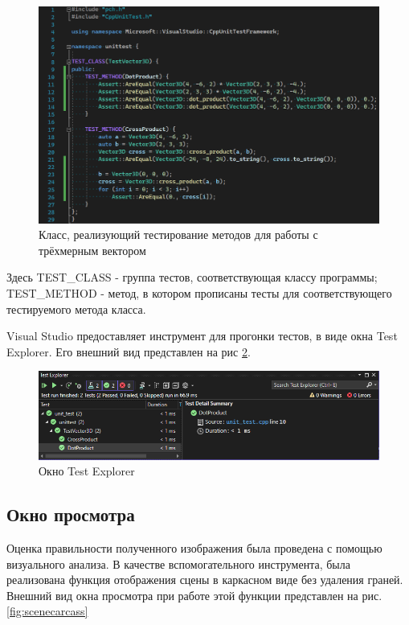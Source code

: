 \documentclass[a4paper, 14pt]{report}
\begin{document}
	\begin{figure}[ht]
		\centering
		\includegraphics[width=1\linewidth]{img/test_code}
		\caption{Класс, реализующий тестирование методов для работы с трёхмерным вектором}
		\label{fig:test_code}
	\end{figure}
	
	Здесь TEST\_CLASS - группа тестов, соответствующая классу программы; TEST\_METHOD - метод, в котором прописаны тесты для соответствующего тестируемого метода класса.
	
	Visual Studio предоставляет инструмент для прогонки тестов, в виде окна Test Explorer. Его внешний вид представлен на рис \ref{fig:test_explorer}.
	
	\begin{figure}[ht]
		\centering
		\includegraphics[width=1\linewidth]{img/test_explorer}
		\caption{Окно Test Explorer}
		\label{fig:test_explorer}
	\end{figure}
	
	
	\subsection{Окно просмотра}
	Оценка правильности полученного изображения была проведена с помощью визуального анализа. В качестве вспомогательного инструмента, была реализована функция отображения сцены в каркасном виде без удаления граней. Внешний вид окна просмотра при работе этой функции представлен на рис. \ref{fig:scenecarcass}
	
\end{document}

